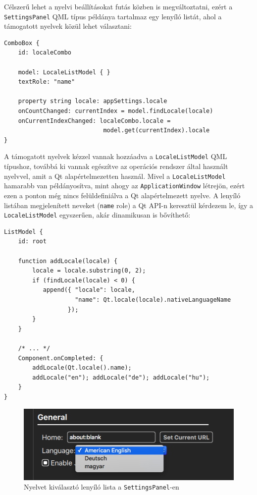 \documentclass[12pt]{report}
\begin{document}
Célszerű lehet a nyelvi beállításokat futás közben is megváltoztatni, ezért a
\texttt{SettingsPanel} QML típus példánya tartalmaz egy lenyíló listát, ahol a támogatott
nyelvek közül lehet választani:
\begin{lstlisting}[title=main.qml]
ComboBox {
    id: localeCombo

    model: LocaleListModel { }
    textRole: "name"

    property string locale: appSettings.locale
    onCountChanged: currentIndex = model.findLocale(locale)
    onCurrentIndexChanged: localeCombo.locale =
                            model.get(currentIndex).locale
}
\end{lstlisting}
A támogatott nyelvek kézzel vannak hozzáadva a \texttt{LocaleListModel} QML típushoz, továbbá
ki vannak egészítve az operációs rendszer által használt nyelvvel, amit a Qt alapértelmezetten
használ. Mivel a \texttt{LocaleListModel} hamarabb van példányosítva, mint ahogy az
\texttt{ApplicationWindow} létrejön, ezért ezen a ponton még nincs felüldefiniálva a Qt
alapértelmezett nyelve. A lenyíló listában megjelenített neveket (\texttt{name} role) a
Qt API-n keresztül kérdezem le, így a \texttt{LocaleListModel} egyszerűen, akár dinamikusan
is bővíthető:
\newpage
\begin{lstlisting}[title=models/LocaleListModel.qml]
ListModel {
    id: root

    function addLocale(locale) {
        locale = locale.substring(0, 2);
        if (findLocale(locale) < 0) {
           append({ "locale": locale,
                    "name": Qt.locale(locale).nativeLanguageName
                  });
        }
    }

    /* ... */
    Component.onCompleted: {
        addLocale(Qt.locale().name);
        addLocale("en"); addLocale("de"); addLocale("hu");
    }
}
\end{lstlisting}

\begin{figure}[H]
    \centering
    \includegraphics[scale=0.6]{locale-combo}
    \caption{
        \label{fig:locale-combo}
        Nyelvet kiválasztó lenyíló lista a \texttt{SettingsPanel}-en
    }
\end{figure}
\end{document}
